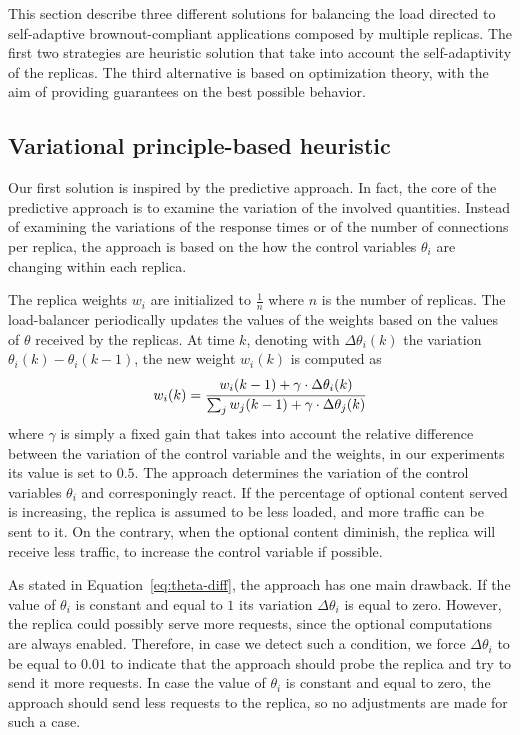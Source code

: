 This section describe three different solutions for balancing the load
directed to self-adaptive brownout-compliant applications composed by
multiple replicas. The first two strategies are heuristic solution
that take into account the self-adaptivity of the replicas. The third
alternative is based on optimization theory, with the aim of providing
guarantees on the best possible behavior.

\subsection{Variational principle-based heuristic}

Our first solution is inspired by the predictive approach. In fact,
the core of the predictive approach is to examine the variation of the
involved quantities. Instead of examining the variations of the
response times or of the number of connections per replica, the
approach is based on the how the control variables $\theta_i$ are
changing within each replica.

The replica weights $w_i$ are initialized to $\frac{1}{n}$ where $n$
is the number of replicas. The load-balancer periodically updates the
values of the weights based on the values of $\theta$ received by the
replicas. At time $k$, denoting with $\Delta \theta_i (k)$ the
variation $\theta_i (k) - \theta_i (k-1)$, the new weight $w_i (k)$ is
computed as
\begin{equation}
  w_i(k) = \cfrac{w_i (k-1) + \gamma \cdot \Delta \theta_i (k)}
                 {\sum_j w_j (k-1) + \gamma \cdot \Delta \theta_j (k)}
\label{eq:theta-diff}
\end{equation}
where $\gamma$ is simply a fixed gain that takes into account the
relative difference between the variation of the control variable and
the weights, in our experiments its value is set to $0.5$. The
approach determines the variation of the control variables $\theta_i$
and corresponingly react. If the percentage of optional content served
is increasing, the replica is assumed to be less loaded, and more
traffic can be sent to it. On the contrary, when the optional content
diminish, the replica will receive less traffic, to increase the
control variable if possible.

As stated in Equation~\eqref{eq:theta-diff}, the approach has one main
drawback. If the value of $\theta_i$ is constant and equal to $1$ its
variation $\Delta \theta_i$ is equal to zero. However, the replica
could possibly serve more requests, since the optional computations
are always enabled. Therefore, in case we detect such a condition, we
force $\Delta \theta_i$ to be equal to $0.01$ to indicate that the
approach should probe the replica and try to send it more requests. In
case the value of $\theta_i$ is constant and equal to zero, the
approach should send less requests to the replica, so no adjustments
are made for such a case.

